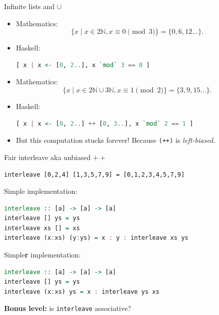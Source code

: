 \documentclass[handout]{beamer}
\def\N{\mathbb{N}}
\begin{document}
\begin{frame}[fragile]{Infinite lists and $\cup$}
\begin{adjustwidth}{-1em}{-1em}

\begin{itemize}[<+->]

\item Mathematics:
$$ \{ x \mid x \in 2\N, x \equiv 0 \!\!\! \pmod 3 \} = \{ 0, 6, 12\ldots \}.$$

\item Haskell:
\begin{lstlisting}[language=Haskell]
[ x | x <- [0, 2..], x `mod` 3 == 0 ]
\end{lstlisting}

\item Mathematics:
$$ \{ x \mid x \in 2\N \cup 3\N, x \equiv 1 \!\!\! \pmod 2 \} = \{ 3, 9, 15\ldots \}.$$

\item Haskell:
\begin{lstlisting}[language=Haskell]
[ x | x <- [0, 2..] ++ [0, 3..], x `mod` 2 == 1 ]
\end{lstlisting}

\item But this computation stucks forever! Because {\tt (++)} is {\em left-biased.}

\end{itemize}

\end{adjustwidth}
\end{frame}

\begin{frame}[fragile]{Fair interleave aka unbiased $+\!\!+$}

{\tt interleave [0,2,4] [1,3,5,7,9] = [0,1,2,3,4,5,7,9] }

\bigskip

\pause

Simple implementation:
\begin{lstlisting}[language=Haskell]
interleave :: [a] -> [a] -> [a]
interleave [] ys = ys
interleave xs [] = xs
interleave (x:xs) (y:ys) = x : y : interleave xs ys
\end{lstlisting}

\pause

Simple{\bf r} implementation:
\begin{lstlisting}[language=Haskell]
interleave :: [a] -> [a] -> [a]
interleave [] ys = ys
interleave (x:xs) ys = x : interleave ys xs
\end{lstlisting}

\pause

{\bf Bonus level:}
is {\tt interleave} associative?

\end{frame}
\end{document}

